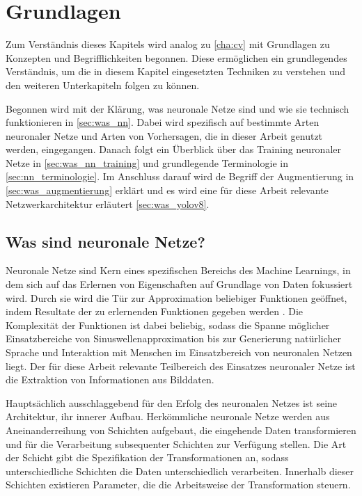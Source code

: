 
\section{Grundlagen}
\label{sec:ki:grundlagen}

Zum Verständnis dieses Kapitels wird analog zu \autoref{cha:cv} mit Grundlagen zu Konzepten und Begrifflichkeiten begonnen. Diese ermöglichen ein grundlegendes Verständnis, um die in diesem Kapitel eingesetzten Techniken zu verstehen und den weiteren Unterkapiteln folgen zu können.

Begonnen wird mit der Klärung, was neuronale Netze sind und wie sie technisch funktionieren in \autoref{sec:was_nn}. Dabei wird spezifisch auf bestimmte Arten neuronaler Netze und Arten von Vorhersagen, die in dieser Arbeit genutzt werden, eingegangen. Danach folgt ein Überblick über das Training neuronaler Netze in \autoref{sec:was_nn_training} und grundlegende Terminologie in \autoref{sec:nn_terminologie}. Im Anschluss darauf wird de Begriff der Augmentierung in \autoref{sec:was_augmentierung} erklärt und es wird eine für diese Arbeit relevante Netzwerkarchitektur erläutert \autoref{sec:was_yolov8}.


\subsection{Was sind neuronale Netze?}
\label{sec:was_nn}

Neuronale Netze sind Kern eines spezifischen Bereichs des Machine Learnings, in dem sich auf das Erlernen von Eigenschaften auf Grundlage von Daten fokussiert wird. Durch sie wird die Tür zur Approximation beliebiger Funktionen geöffnet, indem Resultate der zu erlernenden Funktionen gegeben werden \cite{cv_general}. Die Komplexität der Funktionen ist dabei beliebig, sodass die Spanne möglicher Einsatzbereiche von Sinuswellenapproximation bis zur Generierung natürlicher Sprache und Interaktion mit Menschen im Einsatzbereich von neuronalen Netzen liegt. Der für diese Arbeit relevante Teilbereich des Einsatzes neuronaler Netze ist die Extraktion von Informationen aus Bilddaten.

Hauptsächlich ausschlaggebend für den Erfolg des neuronalen Netzes ist seine Architektur, ihr innerer Aufbau. Herkömmliche neuronale Netze werden aus Aneinanderreihung von Schichten aufgebaut, die eingehende Daten transformieren und für die Verarbeitung subsequenter Schichten zur Verfügung stellen. Die Art der Schicht gibt die Spezifikation der Transformationen an, sodass unterschiedliche Schichten die Daten unterschiedlich verarbeiten. Innerhalb dieser Schichten existieren Parameter, die die Arbeitsweise der Transformation steuern.


